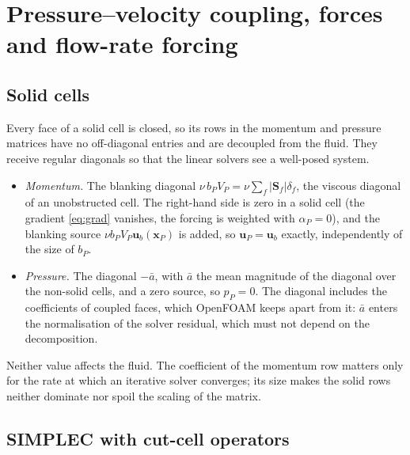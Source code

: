 \documentclass[11pt,a4paper]{article}
\theoremstyle{remark}
\newcommand{\uu}{\bm{u}}
\newcommand{\ub}{\uu_b}
\newcommand{\xx}{\bm{x}}
\newcommand{\Sf}{\bm{S}_f}
\begin{document}
\section{Pressure--velocity coupling, forces and flow-rate forcing}
\label{sec:coupling}

\subsection{Solid cells}
\label{sec:solid}

Every face of a solid cell is closed, so its rows in the momentum and pressure matrices have
no off-diagonal entries and are decoupled from the fluid. They receive regular diagonals so
that the linear solvers see a well-posed system.
\begin{itemize}\itemsep2pt
\item \emph{Momentum.} The blanking diagonal $\nu\,b_PV_P=\nu\sum_f|\Sf|\delta_f$, the
      viscous diagonal of an unobstructed cell. The right-hand side is zero in a solid cell
      (the gradient \eqref{eq:grad} vanishes, the forcing is weighted with $\alpha_P=0$),
      and the blanking source $\nu b_PV_P\ub(\xx_P)$ is added, so $\uu_P=\ub$
      exactly, independently of the size of $b_P$.
\item \emph{Pressure.} The diagonal $-\bar a$, with $\bar a$ the mean magnitude of the
      diagonal over the non-solid cells, and a zero source, so $p_P=0$. The diagonal includes
      the coefficients of coupled faces, which OpenFOAM keeps apart from it: $\bar a$ enters
      the normalisation of the solver residual, which must not depend on the decomposition.
\end{itemize}
Neither value affects the fluid. The coefficient of the momentum row matters only for the
rate at which an iterative solver converges; its size makes the solid rows neither dominate nor
spoil the scaling of the matrix.

\subsection{SIMPLEC with cut-cell operators}
\label{sec:simplec}
\end{document}

